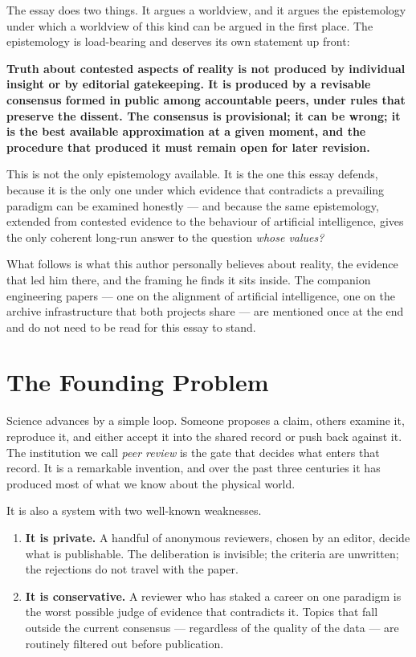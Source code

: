 \documentclass[11pt,a4paper]{article}
\begin{document}
The essay does two things. It argues a worldview, and it argues the
epistemology under which a worldview of this kind can be argued in
the first place. The epistemology is load-bearing and deserves its
own statement up front:

\begin{notebox}
\textbf{Truth about contested aspects of reality is not produced by
individual insight or by editorial gatekeeping. It is produced by
a revisable consensus formed in public among accountable peers,
under rules that preserve the dissent. The consensus is provisional;
it can be wrong; it is the best available approximation at a given
moment, and the procedure that produced it must remain open for
later revision.}
\end{notebox}

This is not the only epistemology available. It is the one this
essay defends, because it is the only one under which evidence that
contradicts a prevailing paradigm can be examined honestly --- and
because the same epistemology, extended from contested evidence to
the behaviour of artificial intelligence, gives the only coherent
long-run answer to the question \emph{whose values?}

What follows is what this author personally believes about reality,
the evidence that led him there, and the framing he finds it sits
inside. The companion engineering papers --- one on the alignment
of artificial intelligence, one on the archive infrastructure that
both projects share --- are mentioned once at the end and do not
need to be read for this essay to stand.

\section{The Founding Problem}

Science advances by a simple loop. Someone proposes a claim, others
examine it, reproduce it, and either accept it into the shared
record or push back against it. The institution we call \emph{peer
review} is the gate that decides what enters that record. It is a
remarkable invention, and over the past three centuries it has
produced most of what we know about the physical world.

It is also a system with two well-known weaknesses.

\begin{enumerate}[leftmargin=1.5em]
  \item \textbf{It is private.} A handful of anonymous reviewers,
        chosen by an editor, decide what is publishable. The
        deliberation is invisible; the criteria are unwritten; the
        rejections do not travel with the paper.
  \item \textbf{It is conservative.} A reviewer who has staked a
        career on one paradigm is the worst possible judge of
        evidence that contradicts it. Topics that fall outside the
        current consensus --- regardless of the quality of the
        data --- are routinely filtered out before publication.
\end{enumerate}
\end{document}
